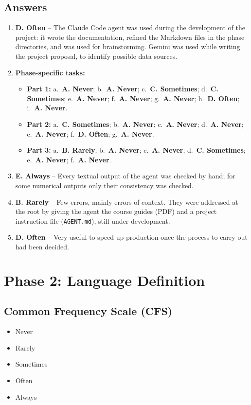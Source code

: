 \subsection*{Answers}
\begin{enumerate}
  \item[\textbf{Q1.}] \textbf{D. Often} -- The Claude Code agent was used during the development of the project: it wrote the documentation, refined the Markdown files in the phase directories, and was used for brainstorming. Gemini was used while writing the project proposal, to identify possible data sources.
  \item[\textbf{Q2.}] \textbf{Phase-specific tasks:}
  \begin{itemize}
    \item[] \textbf{Part 1:} a.\ \textbf{A. Never}; b.\ \textbf{A. Never}; c.\ \textbf{C. Sometimes}; d.\ \textbf{C. Sometimes}; e.\ \textbf{A. Never}; f.\ \textbf{A. Never}; g.\ \textbf{A. Never}; h.\ \textbf{D. Often}; i.\ \textbf{A. Never}.
    \item[] \textbf{Part 2:} a.\ \textbf{C. Sometimes}; b.\ \textbf{A. Never}; c.\ \textbf{A. Never}; d.\ \textbf{A. Never}; e.\ \textbf{A. Never}; f.\ \textbf{D. Often}; g.\ \textbf{A. Never}.
    \item[] \textbf{Part 3:} a.\ \textbf{B. Rarely}; b.\ \textbf{A. Never}; c.\ \textbf{A. Never}; d.\ \textbf{C. Sometimes}; e.\ \textbf{A. Never}; f.\ \textbf{A. Never}.
  \end{itemize}
  \item[\textbf{Q3.}] \textbf{E. Always} -- Every textual output of the agent was checked by hand; for some numerical outputs only their consistency was checked.
  \item[\textbf{Q4.}] \textbf{B. Rarely} -- Few errors, mainly errors of context. They were addressed at the root by giving the agent the course guides (PDF) and a project instruction file (\texttt{AGENT.md}), still under development.
  \item[\textbf{Q5.}] \textbf{D. Often} -- Very useful to speed up production once the process to carry out had been decided.
\end{enumerate}

\section*{Phase 2: Language Definition}

\subsection*{Common Frequency Scale (CFS)}
\begin{itemize}
  \item[A.] Never
  \item[B.] Rarely
  \item[C.] Sometimes
  \item[D.] Often
  \item[E.] Always
\end{itemize}

